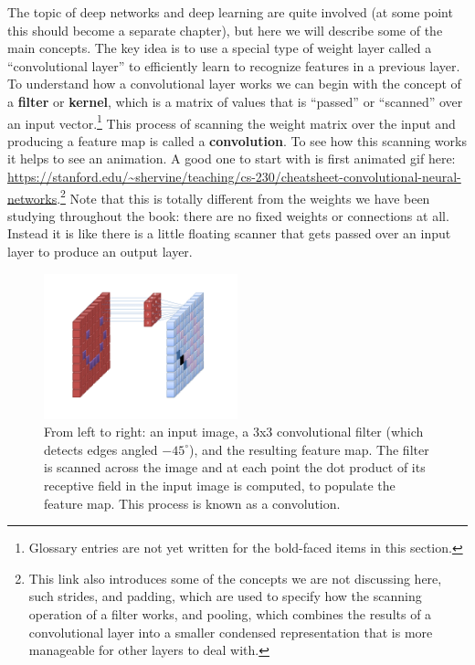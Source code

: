 The topic of deep networks and deep learning are quite involved (at some point this should become a separate chapter), but here we will describe some of the main concepts. The key idea is to use a special type of weight layer  called a ``convolutional layer'' to efficiently learn to recognize features in a previous layer. To understand how a convolutional  layer works we can begin with the concept of a \textbf{filter} or \textbf{kernel}, which is a  matrix of values that is ``passed'' or ``scanned'' over an input vector.\footnote{Glossary entries are not yet written for the bold-faced items in this section.}  This process of scanning the weight matrix over the input and producing a feature map is called a \textbf{convolution}. To see how this scanning works it helps to see an animation. A good one to start with is first animated gif here: \url{https://stanford.edu/~shervine/teaching/cs-230/cheatsheet-convolutional-neural-networks}.\footnote{This link also introduces some of the concepts we are not discussing here, such strides, and padding, which are used to specify how the scanning operation of a filter works, and pooling, which combines the results of a convolutional layer into a smaller  condensed representation that is more manageable for other layers to deal with.} Note that this is totally different from the weights we have been studying throughout the book: there are no fixed weights or  connections at all. Instead it is like there is a little floating scanner that gets passed over an input layer to produce an output layer.

\begin{figure}[h]
\centering
\includegraphics[width=0.5\textwidth]{images/CNN_Filter.png}
\caption[User Cecbur, \url{https://commons.wikimedia.org/wiki/File:Convolutional_Neural_Network_NeuralNetworkFilter.gif}
]{From left to right: an input image, a 3x3 convolutional filter (which detects edges  angled $-45^\circ$), and the resulting feature map. The filter is scanned across the image and at each point the dot product of its receptive field in the input image is computed, to populate the feature map. This process is known as a convolution.}
\label{cnn_filter}
\end{figure}


